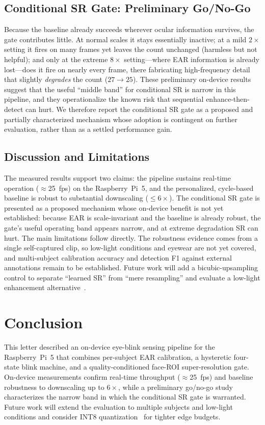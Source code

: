 \documentclass{IEEE_lsens}
\begin{document}
\subsection{Conditional SR Gate: Preliminary Go/No-Go}
\label{sec_srgo}
Because the baseline already succeeds wherever ocular information survives, the
gate contributes little. At normal scales it stays essentially inactive; at a
mild $2\times$ setting it fires on many frames yet leaves the count unchanged
(harmless but not helpful); and only at the extreme $8\times$ setting---where
EAR information is already lost---does it fire on nearly every frame, there
fabricating high-frequency detail that slightly \emph{degrades} the count
($27\!\rightarrow\!25$). These preliminary on-device results suggest that the
useful ``middle band'' for conditional SR is narrow in this pipeline, and they
operationalize the known risk that sequential enhance-then-detect can hurt. We
therefore report the conditional SR gate as a proposed and partially
characterized mechanism whose adoption is contingent on further evaluation,
rather than as a settled performance gain.

\subsection{Discussion and Limitations}
The measured results support two claims: the pipeline sustains real-time
operation ($\approx$25~fps) on the Raspberry~Pi~5, and the personalized,
cycle-based baseline is robust to substantial downscaling ($\le 6\times$). The
conditional SR gate is presented as a proposed mechanism whose on-device benefit
is not yet established: because EAR is scale-invariant and the baseline is
already robust, the gate's useful operating band appears narrow, and at extreme
degradation SR can hurt. The main limitations follow directly. The robustness
evidence comes from a single self-captured clip, so low-light conditions and
eyewear are not yet covered, and multi-subject calibration accuracy and
detection F1 against external annotations remain to be established. Future work
will add a bicubic-upsampling control to separate ``learned SR'' from ``mere
resampling'' and evaluate a low-light enhancement alternative~\cite{guo2020}.

\section{Conclusion}
This letter described an on-device eye-blink sensing pipeline for the
Raspberry~Pi~5 that combines per-subject EAR calibration, a hysteretic
four-state blink machine, and a quality-conditioned face-ROI super-resolution
gate. On-device measurements confirm real-time throughput ($\approx$25~fps) and
baseline robustness to downscaling up to $6\times$, while a preliminary go/no-go
study characterizes the narrow band in which the conditional SR gate is
warranted. Future work will extend the evaluation to multiple subjects and
low-light conditions and consider INT8 quantization~\cite{jacob2018} for tighter
edge budgets.
\end{document}
